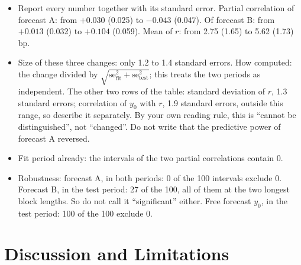 \documentclass{article}
\newenvironment{pts}{\begin{itemize}[nosep,leftmargin=1.15em,topsep=1pt]}{\end{itemize}}
\begin{document}
\begin{note}
\begin{pts}
\item Report every number together with its standard error. Partial correlation of forecast A: from $+0.030$ (0.025) to $-0.043$ (0.047). Of forecast B: from $+0.013$ (0.032) to $+0.104$ (0.059). Mean of $r$: from 2.75 (1.65) to 5.62 (1.73) bp.
\item Size of these three changes: only 1.2 to 1.4 standard errors. How computed: the change divided by $\sqrt{\mathrm{se}_{\mathrm{fit}}^{2}+\mathrm{se}_{\mathrm{test}}^{2}}$; this treats the two periods as independent. The other two rows of the table: standard deviation of $r$, 1.3 standard errors; correlation of $y_0$ with $r$, 1.9 standard errors, outside this range, so describe it separately. By your own reading rule, this is ``cannot be distinguished'', not ``changed''. Do not write that the predictive power of forecast A reversed.
\item Fit period already: the intervals of the two partial correlations contain 0.
\item Robustness: forecast A, in both periods: 0 of the 100 intervals exclude 0. Forecast B, in the test period: 27 of the 100, all of them at the two longest block lengths. So do not call it ``significant'' either. Free forecast $y_0$, in the test period: 100 of the 100 exclude 0.
\end{pts}
\end{note}

\section{Discussion and Limitations}
\end{document}
